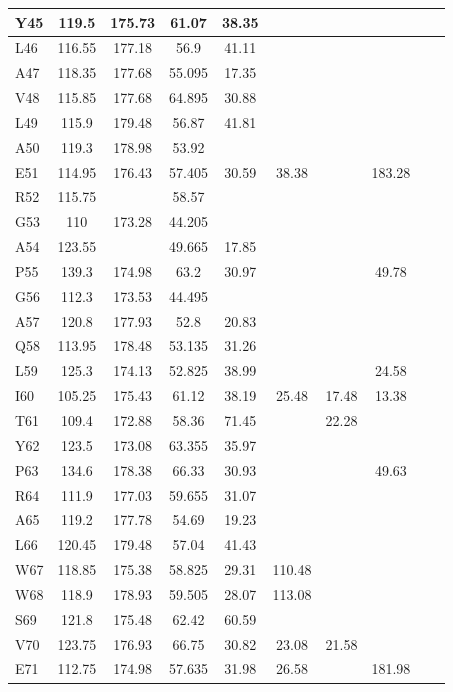 \documentclass[%
 aip,
 amsmath,amssymb,
 preprint,%
]{revtex4-1}
\begin{document}
\begin{center}
\begin{longtable}{l|c|c|c|c|c|c|c|c|c}
Y45 & 119.5 & 175.73 & 61.07 & 38.35 & & & & & \\\hline
L46 & 116.55 & 177.18 & 56.9 & 41.11 & & & & & \\\hline
A47 & 118.35 & 177.68 & 55.095 & 17.35 & & & & & \\\hline
V48 & 115.85 & 177.68 & 64.895 & 30.88 & & & & & \\\hline
L49 & 115.9 & 179.48 & 56.87 & 41.81 & & & & & \\\hline
A50 & 119.3 & 178.98 & 53.92 & & & & & & \\\hline
E51 & 114.95 & 176.43 & 57.405 & 30.59 & 38.38 & & 183.28 & & \\\hline
R52 & 115.75 & & 58.57 & & & & & & \\\hline
G53 & 110 & 173.28 & 44.205 & & & & & & \\\hline
A54 & 123.55 & & 49.665 & 17.85 & & & & & \\\hline
P55 & 139.3 & 174.98 & 63.2 & 30.97 & & & 49.78 & & \\\hline
G56 & 112.3 & 173.53 & 44.495 & & & & & & \\\hline
A57 & 120.8 & 177.93 & 52.8 & 20.83 & & & & & \\\hline
Q58 & 113.95 & 178.48 & 53.135 & 31.26 & & & & & \\\hline
L59 & 125.3 & 174.13 & 52.825 & 38.99 & & & 24.58 & & \\\hline
I60 & 105.25 & 175.43 & 61.12 & 38.19 & 25.48 & 17.48 & 13.38 & & \\\hline
T61 & 109.4 & 172.88 & 58.36 & 71.45 & & 22.28 & & & \\\hline
Y62 & 123.5 & 173.08 & 63.355 & 35.97 & & & & & \\\hline
P63 & 134.6 & 178.38 & 66.33 & 30.93 & & & 49.63 & & \\\hline
R64 & 111.9 & 177.03 & 59.655 & 31.07 & & & & & \\\hline
A65 & 119.2 & 177.78 & 54.69 & 19.23 & & & & & \\\hline
L66 & 120.45 & 179.48 & 57.04 & 41.43 & & & & & \\\hline
W67 & 118.85 & 175.38 & 58.825 & 29.31 & 110.48 & & & & \\\hline
W68 & 118.9 & 178.93 & 59.505 & 28.07 & 113.08 & & & & \\\hline
S69 & 121.8 & 175.48 & 62.42 & 60.59 & & & & & \\\hline
V70 & 123.75 & 176.93 & 66.75 & 30.82 & 23.08 & 21.58 & & & \\\hline
E71 & 112.75 & 174.98 & 57.635 & 31.98 & 26.58 & & 181.98 & & \\\hline

\end{longtable}
\end{center}
\end{document}
